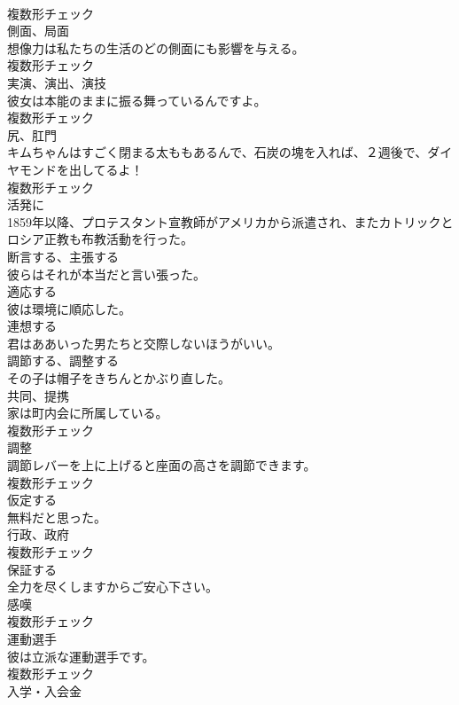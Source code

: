 \documentclass[8pt]{extreport}
\begin{document}
\begin{CJK}{UTF8}{min}
\\	複数形チェック
\\	[名詞]	側面、局面	
\\	想像力は私たちの生活のどの側面にも影響を与える。	
\\	複数形チェック
\\	[名詞]	実演、演出、演技	
\\	彼女は本能のままに振る舞っているんですよ。	
\\	複数形チェック
\\	[名詞]	尻、肛門	
\\	キムちゃんはすごく閉まる太ももあるんで、石炭の塊を入れば、２週後で、ダイヤモンドを出してるよ！	
\\	複数形チェック
\\	[副詞]	活発に	
\\	1859年以降、プロテスタント宣教師がアメリカから派遣され、またカトリックとロシア正教も布教活動を行った。	
\\	[動詞]	断言する、主張する	
\\	彼らはそれが本当だと言い張った。	
\\	[動詞]	適応する	
\\	彼は環境に順応した。	
\\	[動詞]	連想する	
\\	君はああいった男たちと交際しないほうがいい。	
\\	[動詞]	調節する、調整する	
\\	その子は帽子をきちんとかぶり直した。	
\\	[名詞]	共同、提携	
\\	家は町内会に所属している。	
\\	複数形チェック
\\	[名詞]	調整	
\\	調節レバーを上に上げると座面の高さを調節できます。	
\\	複数形チェック
\\	[動詞]	仮定する	
\\	無料だと思った。	
\\	[名詞]	行政、政府	
\\	複数形チェック
\\	[動詞]	保証する	
\\	全力を尽くしますからご安心下さい。	
\\	[名詞]	感嘆	
\\	複数形チェック
\\	[名詞]	運動選手	
\\	彼は立派な運動選手です。	
\\	複数形チェック
\\	[名詞]	入学・入会金	

\end{CJK}
\end{document}
